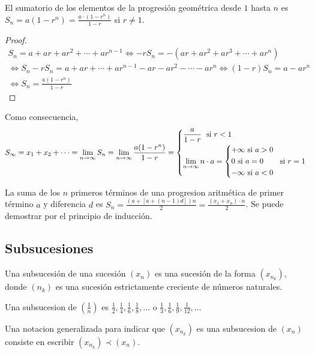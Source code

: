 \begin{proposition}
	El sumatorio de los elementos de la progresión geométrica desde \(1 \) hasta \(n \) es \(S_n = a(1 - r^{n }) = \frac{a \cdot (1-r^{n } )}{1 - r }\) si \(r \neq  1 \).
\end{proposition}
\begin{proof}
	\begin{multline*}
		S_n = a + ar + ar^{2} + \cdots + ar^{n-1} \iff  -rS_n = -(ar + ar^{2} + ar^{3} + \cdots + ar^{n}) \\
		\iff S_n - rS_n = a + ar + \cdots + ar^{n-1} - ar - ar^{2} - \cdots - ar^{n} \iff  (1 - r) S_n = a - ar^{n} \\ \iff S_n = \frac{a(1 - r^{n})}{1 - r}
	\end{multline*}
\end{proof}
Como consecuencia, 
\[
	S_\infty = x_1 + x_2 + \cdots = \lim\limits_{n \to \infty} S_n = \lim\limits_{n \to \infty} \frac{a(1-r^{n} ) }{1 - r} = \begin{dcases}
		\frac{a }{1-r } \; \text{ si } r < 1 \\
		\lim\limits_{n \to \infty} n \cdot a = \begin{dcases}
			                                       +\infty \text{ si } a > 0 \\
			                                       0 \text{ si } a = 0       \\
			                                       -\infty \text{ si } a < 0 \\
		                                       \end{dcases} \; \text{ si } r = 1
	\end{dcases}
\]

La suma de los \(n \) primeros términos de una progresion aritmética de primer término \(a \) y diferencia \(d \) es \(S_n = \frac{(a + [a + (n-1)d])n}{2} = \frac{(x_1 + x_n)\cdot n}{2}\). Se puede demostrar por el principio de inducción. 

\subsection{Subsucesiones}
\begin{definition}
	Una subsucesión de una sucesión \((x_n )\) es una sucesión de la forma \((x_{n_k})\), donde \((n_k )\) es una sucesión estrictamente creciente de números naturales.
\end{definition}
\begin{example}
	Una subsucesion de \((\frac{1}{n })\) es \(\frac{1}{2}, \frac{1}{4}, \frac{1}{6}, \frac{1}{8}, \ldots \) o \(\frac{1}{3}, \frac{1}{6}, \frac{1}{9}, \frac{1}{12}, \ldots \)
\end{example}
Una notacion generalizada para indicar que \((x_{n_k })\) es una subsucesion de \((x_n )\) consiste en escribir \((x_{n_k}) \prec (x_n)\).


